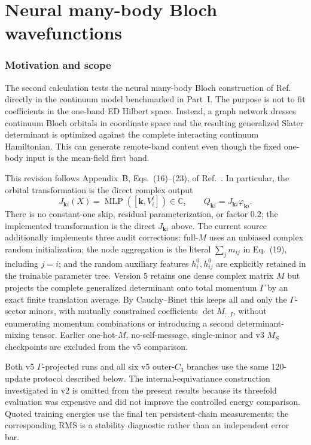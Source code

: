 \part{Neural many-body Bloch wavefunctions}

\section{Motivation and scope}

The second calculation tests the neural many-body Bloch construction of
Ref.~\cite{luo} directly in the continuum model benchmarked in Part~I. The
purpose is not to fit coefficients in the one-band ED Hilbert space. Instead,
a graph network dresses continuum Bloch orbitals in coordinate space and the
resulting generalized Slater determinant is optimized against the complete
interacting continuum Hamiltonian. This can generate remote-band content even
though the fixed one-body input is the mean-field first band.

This revision follows Appendix~B, Eqs.~(16)--(23), of Ref.~\cite{luo}.
In particular, the orbital transformation is the direct complex output
\begin{equation}
 J_{\bm k i}(X)=\operatorname{MLP}([\bm k,V_i^t])\in\mathbb C,
 \qquad Q_{\bm k i}=J_{\bm k i}\varphi_{\bm k i}.
 \label{eq:scope-direct-j}
\end{equation}
There is no constant-one skip, residual parameterization, or factor $0.2$;
the implemented transformation is the direct $J_{\bm k i}$ above.
The current source additionally implements three audit corrections: full-$M$
uses an unbiased complex random initialization; the node aggregation is the
literal $\sum_jm_{ij}$ in Eq.~(19), including $j=i$; and the random auxiliary
features $h_i^0,h_{ij}^0$ are explicitly retained in the trainable parameter
tree. Version 5 retains one dense complex matrix $M$ but projects the complete
generalized determinant onto total momentum $\Gamma$ by an exact finite
translation average. By Cauchy--Binet this keeps all and only the
$\Gamma$-sector minors, with mutually constrained coefficients
$\det M_{:,I}$, without enumerating momentum combinations or introducing a
second determinant-mixing tensor. Earlier one-hot-$M$, no-self-message,
single-minor and v3 $M_S$ checkpoints are excluded from the v5 comparison.

Both v5 $\Gamma$-projected runs and all six v5 outer-$C_3$ branches use the
same 120-update protocol described below. The
internal-equivariance construction investigated in v2 is omitted from the
present results because its threefold evaluation was expensive and did not
improve the controlled energy comparison. Quoted training
energies use the final ten persistent-chain measurements; the corresponding
RMS is a stability diagnostic rather than an independent error bar.


